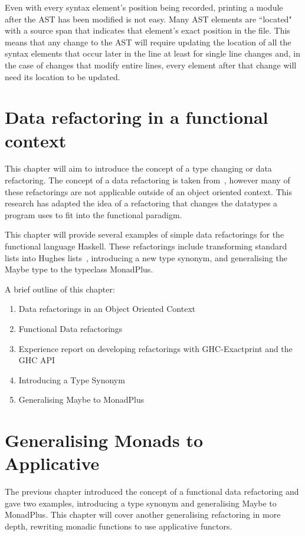 Even with every syntax element's position being recorded, printing a module after the AST has been modified is not easy. Many AST elements are ``located" with a source span that indicates that element's exact position in the file. This means that any change to the AST will require updating the location of all the syntax elements that occur later in the line at least for single line changes and, in the case of changes that modify entire lines, every element after that change will need its location to be updated.




\chapter{Data refactoring in a functional context}
This chapter will aim to introduce the concept of a type changing or data refactoring. The concept of a data refactoring is taken from~\cite{fowler}, however many of these refactorings are not applicable outside of an object oriented context. This research has adapted the idea of a refactoring that changes the datatypes a program uses to fit into the functional paradigm.

This chapter will provide several examples of simple data refactorings for the functional language Haskell. These refactorings include transforming standard lists into Hughes lists~\citep{hughesList}, introducing a new type synonym, and generalising the Maybe type to the typeclass MonadPlus. 

A brief outline of this chapter:

\begin{enumerate}
\item Data refactorings in an Object Oriented Context
\item Functional Data refactorings
\item Experience report on developing refactorings with GHC-Exactprint and the GHC API
\item Introducing a Type Synonym
\item Generalising Maybe to MonadPlus
\end{enumerate}

\chapter{Generalising Monads to Applicative}
\label{applicative}
The previous chapter introduced the concept of a functional data refactoring and gave two examples, introducing a type synonym and generalising Maybe to MonadPlus. This chapter will cover another generalising refactoring in more depth, rewriting monadic functions to use applicative functors. 

